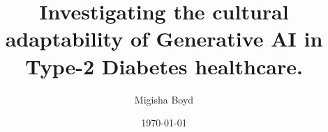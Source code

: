 \documentclass[11pt, a4paper, twoside, openright]{custard}
\begin{document}
	
	\title{Investigating the cultural adaptability of Generative AI in Type-2 Diabetes healthcare.}
	\author{Migisha Boyd}
	
	
	
	\date{\today}
	
	\maketitle
	
\end{document}
